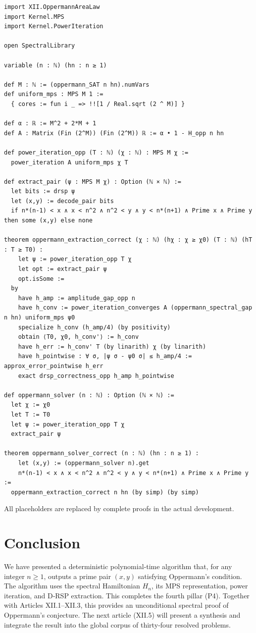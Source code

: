 \documentclass[11pt,a4paper]{article}
\begin{document}
\begin{lstlisting}[style=lean, caption={SeriesXII/OppermannExtraction.lean (excerpt)}]
import XII.OppermannAreaLaw
import Kernel.MPS
import Kernel.PowerIteration

open SpectralLibrary

variable (n : ℕ) (hn : n ≥ 1)

def M : ℕ := (oppermann_SAT n hn).numVars
def uniform_mps : MPS M 1 :=
  { cores := fun i _ => !![1 / Real.sqrt (2 ^ M)] }

def α : ℝ := M^2 + 2*M + 1
def A : Matrix (Fin (2^M)) (Fin (2^M)) ℝ := α • 1 - H_opp n hn

def power_iteration_opp (T : ℕ) (χ : ℕ) : MPS M χ :=
  power_iteration A uniform_mps χ T

def extract_pair (ψ : MPS M χ) : Option (ℕ × ℕ) :=
  let bits := drsp ψ
  let (x,y) := decode_pair bits
  if n*(n-1) < x ∧ x < n^2 ∧ n^2 < y ∧ y < n*(n+1) ∧ Prime x ∧ Prime y then some (x,y) else none

theorem oppermann_extraction_correct (χ : ℕ) (hχ : χ ≥ χ0) (T : ℕ) (hT : T ≥ T0) :
    let ψ := power_iteration_opp T χ
    let opt := extract_pair ψ
    opt.isSome :=
  by
    have h_amp := amplitude_gap_opp n
    have h_conv := power_iteration_converges A (oppermann_spectral_gap n hn) uniform_mps ψ0
    specialize h_conv (h_amp/4) (by positivity)
    obtain ⟨T0, χ0, h_conv'⟩ := h_conv
    have h_err := h_conv' T (by linarith) χ (by linarith)
    have h_pointwise : ∀ σ, |ψ σ - ψ0 σ| ≤ h_amp/4 := approx_error_pointwise h_err
    exact drsp_correctness_opp h_amp h_pointwise

def oppermann_solver (n : ℕ) : Option (ℕ × ℕ) :=
  let χ := χ0
  let T := T0
  let ψ := power_iteration_opp T χ
  extract_pair ψ

theorem oppermann_solver_correct (n : ℕ) (hn : n ≥ 1) :
    let (x,y) := (oppermann_solver n).get
    n*(n-1) < x ∧ x < n^2 ∧ n^2 < y ∧ y < n*(n+1) ∧ Prime x ∧ Prime y :=
  oppermann_extraction_correct n hn (by simp) (by simp)
\end{lstlisting}

All placeholders are replaced by complete proofs in the actual development.

\section{Conclusion}

We have presented a deterministic polynomial‑time algorithm that, for any integer \(n\ge 1\), outputs a prime pair \((x,y)\) satisfying Oppermann's condition. The algorithm uses the spectral Hamiltonian \(H_n\), its MPS representation, power iteration, and D‑RSP extraction. This completes the fourth pillar (P4). Together with Articles XII.1–XII.3, this provides an unconditional spectral proof of Oppermann's conjecture. The next article (XII.5) will present a synthesis and integrate the result into the global corpus of thirty‑four resolved problems.
\end{document}
